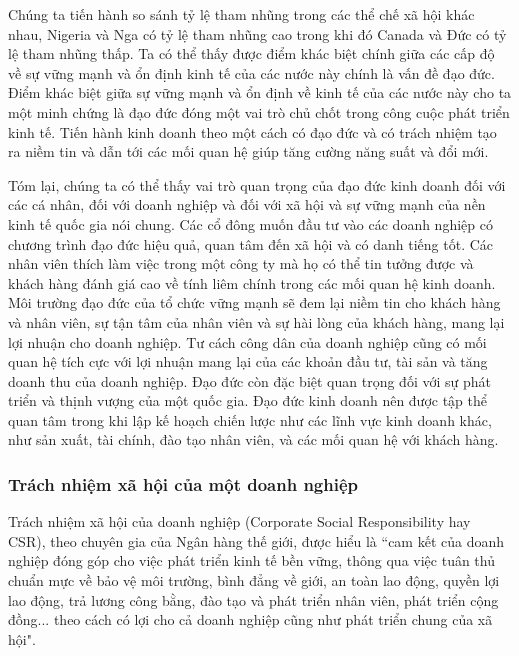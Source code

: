 \documentclass{article}
\begin{document}
\begin{itemize}
                \qquad Chúng ta tiến hành so sánh tỷ lệ tham nhũng trong các thể chế xã hội khác nhau, Nigeria và Nga có tỷ lệ tham nhũng cao trong khi đó Canada và Đức có tỷ lệ tham nhũng thấp. Ta có thể thấy được điểm khác biệt chính giữa các cấp độ về sự vững mạnh và ổn định kinh tế của các nước này chính là vấn đề đạo đức. Điểm khác biệt giữa sự vững mạnh và ổn định về kinh tế của các nước này cho ta một minh chứng là đạo đức đóng một vai trò chủ chốt trong công cuộc phát triển kinh tế. Tiến hành kinh doanh theo một cách có đạo đức và có trách nhiệm tạo ra niềm tin và dẫn tới các mối quan hệ giúp tăng cường năng suất và đổi mới.

                \qquad Tóm lại, chúng ta có thể thấy vai trò quan trọng của đạo đức kinh doanh đối với các cá nhân, đối với doanh nghiệp và đối với xã hội và sự vững mạnh của nền kinh tế quốc gia nói chung. Các cổ đông muốn đầu tư vào các doanh nghiệp có chương trình đạo đức hiệu quả, quan tâm đến xã hội và có danh tiếng tốt. Các nhân viên thích làm việc trong một công ty mà họ có thể tin tưởng được và khách hàng đánh giá cao về tính liêm chính trong các mối quan hệ kinh doanh. Môi trường đạo đức của tổ chức vững mạnh sẽ đem lại niềm tin cho khách hàng và nhân viên, sự tận tâm của nhân viên và sự hài lòng của khách hàng, mang lại lợi nhuận cho doanh nghiệp. Tư cách công dân của doanh nghiệp cũng có mối quan hệ tích cực với lợi nhuận mang lại của các khoản đầu tư, tài sản và tăng doanh thu của doanh nghiệp. Đạo đức còn đặc biệt quan trọng đối với sự phát triển và thịnh vượng của một quốc gia. Đạo đức kinh doanh nên được tập thể quan tâm trong khi lập kế hoạch chiến lược như các lĩnh vực kinh doanh khác, như sản xuất, tài chính, đào tạo nhân viên, và các mối quan hệ với khách hàng.

            \end{itemize}

    \subsubsection{Trách nhiệm xã hội của một doanh nghiệp}
        \vspace{0.2cm}
        Trách nhiệm xã hội của doanh nghiệp (Corporate Social Responsibility hay CSR), theo chuyên gia của Ngân hàng thế giới, được hiểu là “cam kết của doanh nghiệp đóng góp cho việc phát triển kinh tế bền vững, thông qua việc tuân thủ chuẩn mực về bảo vệ môi trường, bình đẳng về giới, an toàn lao động, quyền lợi lao động, trả lương công bằng, đào tạo và phát triển nhân viên, phát triển cộng đồng... theo cách có lợi cho cả doanh nghiệp cũng như phát triển chung của xã hội".
        
\end{document}
